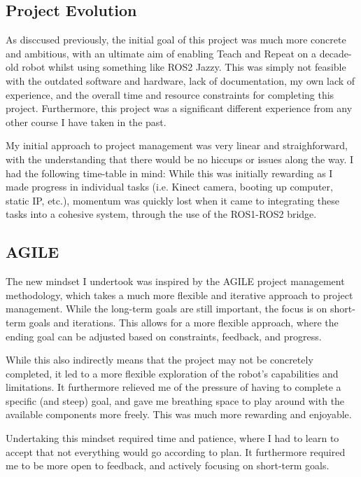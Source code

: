\documentclass[a4paper, 12pt]{article}
\newif\ifshownotes
\newcommand{\notes}[1]{\ifshownotes\textcolor{blue}{#1}\fi}
\begin{document}
    \subsection{Project Evolution}

    As disccused previously, the initial goal of this project was much more concrete and ambitious, with an ultimate aim of enabling Teach and Repeat on a decade-old robot whilst using something like ROS2 Jazzy. This was simply not feasible with the outdated software and hardware, lack of documentation, my own lack of experience, and the overall time and resource constraints for completing this project. Furthermore, this project was a significant different experience from any other course I have taken in the past.
    
    My initial approach to project management was very linear and straighforward, with the understanding that there would be no hiccups or issues along the way. I had the following time-table in mind: \notes{maybe insert a table showcasing the plan here?} While this was initially rewarding as I made progress in individual tasks (i.e. Kinect camera, booting up computer, static IP, etc.), momentum was quickly lost when it came to integrating these tasks into a cohesive system, through the use of the ROS1-ROS2 bridge. 

    \subsection{AGILE}

    The new mindset I undertook was inspired by the AGILE project management methodology, which takes a much more flexible and iterative approach to project management. While the long-term goals are still important, the focus is on short-term goals and iterations. This allows for a more flexible approach, where the ending goal can be adjusted based on constraints, feedback, and progress. 

    While this also indirectly means that the project may not be concretely completed, it led to a more flexible exploration of the robot's capabilities and limitations. It furthermore relieved me of the pressure of having to complete a specific (and steep) goal, and gave me breathing space to play around with the available components more freely. This was much more rewarding and enjoyable.

    Undertaking this mindset required time and patience, where I had to learn to accept that not everything would go according to plan. It furthermore required me to be more open to feedback, and actively focusing on short-term goals. 
\end{document}
